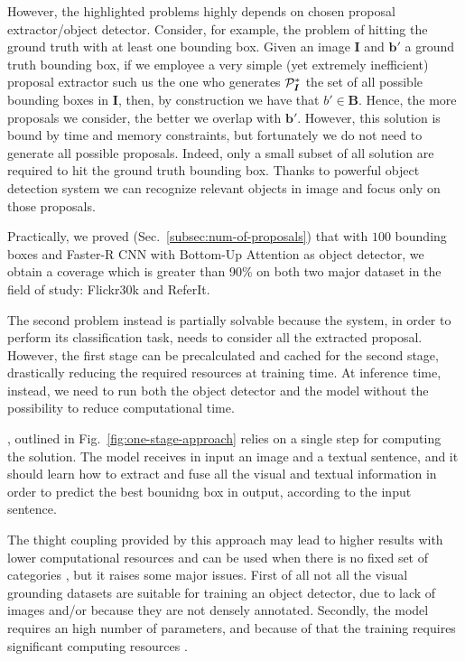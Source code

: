 However, the highlighted problems highly depends on chosen proposal
extractor/object detector. Consider, for example, the problem of
hitting the ground truth with at least one bounding box. Given an
image $\bm{I}$ and $\bm{b}'$ a ground truth bounding box, if we
employee a very simple (yet extremely inefficient) proposal extractor
such us the one who generates $\mathcal{P}^*_{\bm{I}}$ the set of all
possible bounding boxes in $\bm{I}$, then, by construction we have
that $b' \in \bm{B}$. Hence, the more proposals we consider, the
better we overlap with $\bm{b}'$. However, this solution is bound by
time and memory constraints, but fortunately we do not need to
generate all possible proposals. Indeed, only a small subset of all
solution are required to hit the ground truth bounding box. Thanks to
powerful object detection system we can recognize relevant objects in
image and focus only on those proposals.

Practically, we proved (Sec.~\ref{subsec:num-of-proposals}) that with
$100$ bounding boxes and Faster-R CNN with Bottom-Up Attention
\cite{sharma2020understanding} as object detector, we obtain a
coverage which is greater than 90\% on both two major dataset in the
field of study: Flickr30k and ReferIt.

The second problem instead is partially solvable because the system,
in order to perform its classification task, needs to consider all the
extracted proposal. However, the first stage can be precalculated and
cached for the second stage, drastically reducing the required
resources at training time. At inference time, instead, we need to run
both the object detector and the model without the possibility to
reduce computational time.

, outlined in
Fig.~\ref{fig:one-stage-approach} relies on a single step for
computing the solution. The model receives in input an image and a
textual sentence, and it should learn how to extract and fuse all the
visual and textual information in order to predict the best bounidng
box in output, according to the input sentence. 

The thight coupling provided by this approach may lead to higher
results with lower computational resources \cite{yang2019fast} and can
be used when there is no fixed set of categories \cite{sadhu2019zero},
but it raises some major issues. First of all not all the visual
grounding datasets are suitable for training an object detector, due
to lack of images and/or because they are not densely annotated.
Secondly, the model requires an high number of parameters, and because
of that the training requires significant computing resources
\cite{rigoni2021better}.

